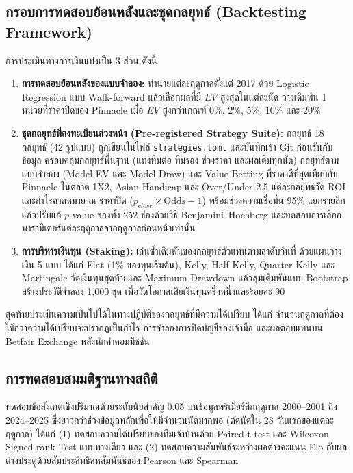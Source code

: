 \subsection{กรอบการทดสอบย้อนหลังและชุดกลยุทธ์ (Backtesting Framework)}
การประเมินทางการเงินแบ่งเป็น 3 ส่วน ดังนี้
\begin{enumerate}[label=\arabic*)]
    \item \textbf{การทดสอบย้อนหลังของแบบจำลอง:} ทำนายแต่ละฤดูกาลตั้งแต่ 2017 ด้วย Logistic Regression แบบ Walk-forward แล้วเลือกผลที่มี $EV$ สูงสุดในแต่ละนัด วางเดิมพัน 1 หน่วยที่ราคาปิดของ Pinnacle เมื่อ $EV$ สูงกว่าเกณฑ์ $0\%$, $2\%$, $5\%$, $10\%$ และ $20\%$
    \item \textbf{ชุดกลยุทธ์ที่ลงทะเบียนล่วงหน้า (Pre-registered Strategy Suite):} กลยุทธ์ 18 กลยุทธ์ (42 รูปแบบ) ถูกเขียนในไฟล์ \texttt{strategies.toml} และบันทึกเข้า Git ก่อนรันกับข้อมูล ครอบคลุมกลยุทธ์พื้นฐาน (แทงทีมต่อ ทีมรอง ช่วงราคา และผลเดิมทุกนัด) กลยุทธ์ตามแบบจำลอง (Model EV และ Model Draw) และ Value Betting ที่ราคาดีที่สุดเทียบกับ Pinnacle \cite{kaunitz2017beating} ในตลาด 1X2, Asian Handicap และ Over/Under 2.5 แต่ละกลยุทธ์วัด ROI และกำไรคาดหมาย ณ ราคาปิด ($p_{close} \times \text{Odds} - 1$) พร้อมช่วงความเชื่อมั่น 95\% แยกรายลีก แล้วปรับแก้ $p$-value ของทั้ง 252 ช่องด้วยวิธี Benjamini--Hochberg \cite{benjamini1995controlling} และทดสอบการเลือกพารามิเตอร์แต่ละฤดูกาลจากฤดูกาลก่อนหน้าเท่านั้น
    \item \textbf{การบริหารเงินทุน (Staking):} เล่นซ้ำเดิมพันของกลยุทธ์ตัวแทนตามลำดับวันที่ ด้วยแผนวางเงิน 5 แบบ ได้แก่ Flat (1\% ของทุนเริ่มต้น), Kelly, Half Kelly, Quarter Kelly และ Martingale วัดเงินทุนสุดท้ายและ Maximum Drawdown แล้วสุ่มเดิมพันแบบ Bootstrap สร้างประวัติจำลอง 1,000 ชุด เพื่อวัดโอกาสเสียเงินทุนครึ่งหนึ่งและร้อยละ 90
\end{enumerate}
สุดท้ายประเมินความเป็นไปได้ในทางปฏิบัติของกลยุทธ์ที่มีความได้เปรียบ ได้แก่ จำนวนฤดูกาลที่ต้องใช้กว่าความได้เปรียบจะปรากฏเป็นกำไร การจำลองการปิดบัญชีของเจ้ามือ และผลตอบแทนบน Betfair Exchange หลังหักค่าคอมมิชชัน

\subsection{การทดสอบสมมติฐานทางสถิติ}
ทดสอบข้อสังเกตเชิงปริมาณด้วยระดับนัยสำคัญ 0.05 บนข้อมูลพรีเมียร์ลีกฤดูกาล 2000--2001 ถึง 2024--2025 ซึ่งยาวกว่าช่วงข้อมูลหลักเพื่อให้มีจำนวนนัดมากพอ (ตัดนัดใน 28 วันแรกของแต่ละฤดูกาล) ได้แก่ (1) ทดสอบความได้เปรียบของทีมเจ้าบ้านด้วย Paired t-test และ Wilcoxon Signed-rank Test แบบทางเดียว และ (2) ทดสอบความสัมพันธ์ระหว่างผลต่างคะแนน Elo กับผลต่างประตูด้วยสัมประสิทธิ์สหสัมพันธ์ของ Pearson และ Spearman

